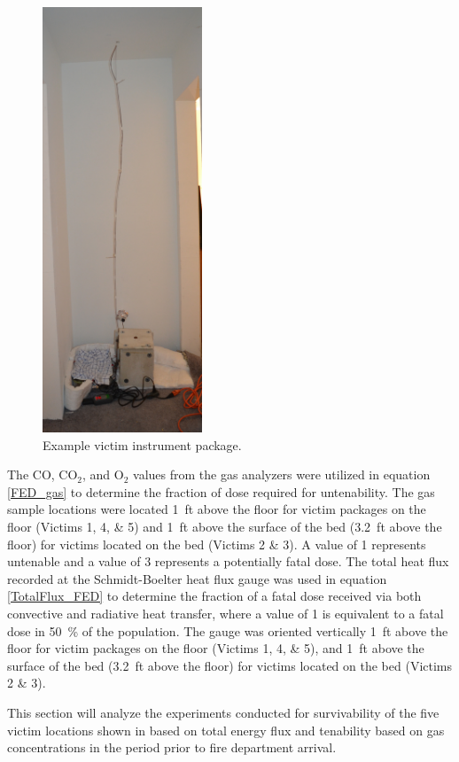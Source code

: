 \documentclass[12pt,oneside]{book}
\begin{document}
\begin{figure}[H]
	\centering
	\includegraphics[height=5in]{../0_Images/Instrumentation/Victim_Package}
	\caption{Example victim instrument package.}
	\label{fig:vic_package}
\end{figure}

The CO, CO$_{2}$, and O$_{2}$ values from the gas analyzers were utilized in equation \ref{FED_gas} to determine the fraction of dose required for untenability. The gas sample locations were located 1~ft above the floor for victim packages on the floor (Victims 1, 4, \& 5) and 1~ft above the surface of the bed (3.2~ft above the floor) for victims located on the bed (Victims 2 \& 3). A value of 1 represents untenable and a value of 3 represents a potentially fatal dose. The total heat flux recorded at the Schmidt-Boelter heat flux gauge was used in equation \ref{TotalFlux_FED} to determine the fraction of a fatal dose received via both convective and radiative heat transfer, where a value of 1 is equivalent to a fatal dose in 50~\% of the population. The gauge was oriented vertically 1~ft above the floor for victim packages on the floor (Victims 1, 4, \& 5), and 1~ft above the surface of the bed (3.2~ft above the floor) for victims located on the bed (Victims 2 \& 3).

This section will analyze the experiments conducted for survivability of the five victim locations shown in  based on total energy flux and tenability based on gas concentrations in the period prior to fire department arrival. 
\end{document}
